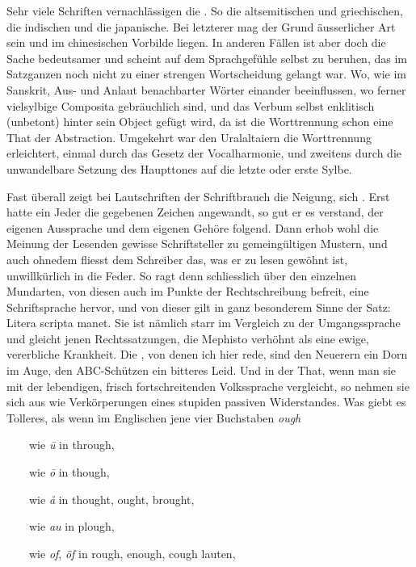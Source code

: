 \largerpage[-1]Sehr viele Schriften vernachlässigen die . So die altsemitischen und griechischen, die indischen und die japanische. Bei letzterer mag der Grund äusserlicher Art sein und im chinesischen Vorbilde liegen. In anderen Fällen ist aber doch die Sache bedeutsamer und scheint auf dem Sprachgefühle selbst zu beruhen, das im Satzganzen noch nicht zu einer strengen Wortscheidung gelangt war. Wo, wie im Sanskrit, Aus- und Anlaut benachbarter Wörter einander beeinflussen, wo ferner vielsylbige Composita gebräuchlich sind, und das \label{fp.141} Verbum selbst enklitisch (unbetont) hinter sein Object gefügt wird, da ist die Worttrennung schon eine That der Abstraction. Umgekehrt war den Uralaltaiern die Worttrennung erleichtert, einmal durch das Gesetz der Vocalharmonie, und zweitens durch die unwandelbare Setzung des Haupttones auf die letzte oder erste Sylbe.

Fast überall zeigt bei Lautschriften der Schriftbrauch die Neigung, sich . Erst hatte ein Jeder die gegebenen Zeichen angewandt, so gut er es verstand, der eigenen Aussprache und dem eigenen Gehöre folgend. Dann erhob wohl die Meinung der Lesenden gewisse Schriftsteller zu gemeingültigen Mustern, und auch ohnedem fliesst dem Schreiber das, was er zu lesen gewöhnt ist, unwillkürlich in die Feder. So ragt denn schliesslich über den einzelnen Mundarten, von diesen auch im Punkte der Rechtschreibung befreit, eine Schriftsprache hervor, und von dieser gilt in ganz besonderem Sinne der Satz: Litera scripta manet. Sie ist nämlich starr im Vergleich zu der  Umgangssprache und gleicht jenen Rechtssatzungen, die Mephisto verhöhnt als eine ewige, vererbliche Krankheit. Die , von denen ich hier rede, sind den Neuerern ein Dorn im Auge, den ABC-Schützen ein bitteres Leid. Und in der That, wenn man sie mit der lebendigen, frisch fortschreitenden Volkssprache vergleicht, so nehmen sie sich aus wie Verkörperungen eines stupiden passiven Widerstandes. Was giebt es Tolleres, als wenn im Englischen jene vier Buchstaben \textit{ough}

~~~~wie \textit{ū} in through,

~~~~wie \textit{ō} in though,

~~~~wie \textit{å} in thought, ought, brought,

~~~~wie \textit{au} in plough,

~~~~wie \textit{of}, \textit{öf} in rough, enough, cough lauten,

